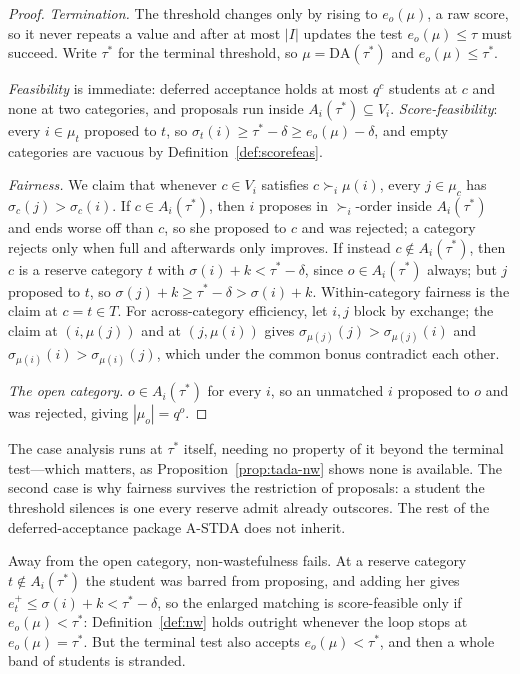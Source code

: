 \documentclass[a4paper,twoside]{article}
\theoremstyle{definition}
\begin{document}
\begin{proof}
\emph{Termination.} The threshold changes only by rising to $e_o(\mu)$, a raw score, so it never repeats a value and after at most $|I|$ updates the test $e_o(\mu)\le\tau$ must succeed. Write $\tau^\ast$ for the terminal threshold, so $\mu=\mathrm{DA}(\tau^\ast)$ and $e_o(\mu)\le\tau^\ast$.

\emph{Feasibility} is immediate: deferred acceptance holds at most $q^c$ students at $c$ and none at two categories, and proposals run inside $A_i(\tau^\ast)\subseteq V_i$. \emph{Score-feasibility}: every $i\in\mu_t$ proposed to $t$, so $\sigma_t(i)\ge\tau^\ast-\delta\ge e_o(\mu)-\delta$, and empty categories are vacuous by Definition~\ref{def:scorefeas}.

\emph{Fairness.} We claim that whenever $c\in V_i$ satisfies $c\succ_i\mu(i)$, every $j\in\mu_c$ has $\sigma_c(j)>\sigma_c(i)$. If $c\in A_i(\tau^\ast)$, then $i$ proposes in $\succ_i$-order inside $A_i(\tau^\ast)$ and ends worse off than $c$, so she proposed to $c$ and was rejected; a category rejects only when full and afterwards only improves. If instead $c\notin A_i(\tau^\ast)$, then $c$ is a reserve category $t$ with $\sigma(i)+k<\tau^\ast-\delta$, since $o\in A_i(\tau^\ast)$ always; but $j$ proposed to $t$, so $\sigma(j)+k\ge\tau^\ast-\delta>\sigma(i)+k$. Within-category fairness is the claim at $c=t\in T$. For across-category efficiency, let $i,j$ block by exchange; the claim at $(i,\mu(j))$ and at $(j,\mu(i))$ gives $\sigma_{\mu(j)}(j)>\sigma_{\mu(j)}(i)$ and $\sigma_{\mu(i)}(i)>\sigma_{\mu(i)}(j)$, which under the common bonus contradict each other.

\emph{The open category.} $o\in A_i(\tau^\ast)$ for every $i$, so an unmatched $i$ proposed to $o$ and was rejected, giving $|\mu_o|=q^o$.
\end{proof}

The case analysis runs at $\tau^\ast$ itself, needing no property of it beyond the terminal test---which matters, as Proposition~\ref{prop:tada-nw} shows none is available. The second case is why fairness survives the restriction of proposals: a student the threshold silences is one every reserve admit already outscores. The rest of the deferred-acceptance package A-STDA does not inherit.

Away from the open category, non-wastefulness fails. At a reserve category $t\notin A_i(\tau^\ast)$ the student was barred from proposing, and adding her gives $e_t^+\le\sigma(i)+k<\tau^\ast-\delta$, so the enlarged matching is score-feasible only if $e_o(\mu)<\tau^\ast$: Definition~\ref{def:nw} holds outright whenever the loop stops at $e_o(\mu)=\tau^\ast$. But the terminal test also accepts $e_o(\mu)<\tau^\ast$, and then a whole band of students is stranded.
\end{document}

